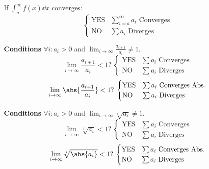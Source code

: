 \documentclass{article}
\begin{document}
\begin{multicols}{2}
\begin{tcolorboxcols}[title={Integral Test}]
        \noindent If $\displaystyle\int_a^\infty f(x) \dd{x}$ converges:
        \begin{equation*}
            \begin{cases}
                \text{YES} & \text{$\sum_{i=a}^\infty a_i$ Converges} \\
                \text{NO}  & \text{$\sum a_i$ Diverges}
            \end{cases}
        \end{equation*}
    \end{tcolorboxcols}
    \begin{tcolorboxcols}[title={Ratio Test}]
        \textbf{Conditions} $\forall i:a_i>0$ and $\displaystyle \lim_{i\to\infty}\frac{a_{i+1}}{a_i}\neq 1$.
        \begin{equation*}
            \text{$\lim_{i\to\infty}\frac{a_{i+1}}{a_i} < 1$?}\:
            \begin{cases}
                \text{YES} & \text{$\sum a_i$ Converges} \\
                \text{NO}  & \text{$\sum a_i$ Diverges}
            \end{cases}
        \end{equation*}
        \begin{equation*}
            \text{$\lim_{i\to\infty}\abs{\frac{a_{i+1}}{a_i}} < 1$?}\:
            \begin{cases}
                \text{YES} & \text{$\sum a_i$ Converges Abs.} \\
                \text{NO}  & \text{$\sum a_i$ Diverges}
            \end{cases}
        \end{equation*}
    \end{tcolorboxcols}
    \begin{tcolorboxcols}[title={Root Test}]
        \textbf{Conditions} $\forall i:a_i>0$ and $\displaystyle \lim_{i\to\infty}\sqrt[i]{a_i}\neq 1$.
        \begin{equation*}
            \text{$\lim_{i\to\infty}\sqrt[i]{a_i} < 1$?}\:
            \begin{cases}
                \text{YES} & \text{$\sum a_i$ Converges} \\
                \text{NO}  & \text{$\sum a_i$ Diverges}
            \end{cases}
        \end{equation*}
        \begin{equation*}
            \text{$\lim_{i\to\infty}\sqrt[i]{\abs{a_i}} < 1$?}\:
            \begin{cases}
                \text{YES} & \text{$\sum a_i$ Converges Abs.} \\
                \text{NO}  & \text{$\sum a_i$ Diverges}
            \end{cases}
        \end{equation*}
    \end{tcolorboxcols}
\end{multicols}
\pagebreak
%
\end{document}

